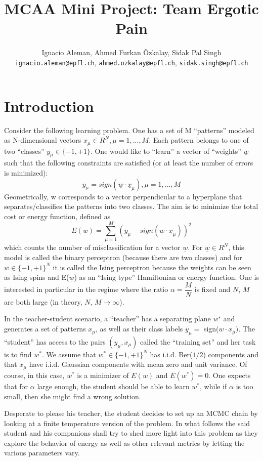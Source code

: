 \documentclass[a4paper]{article}
\title{MCAA Mini Project: Team Ergotic Pain}
\author{Ignacio Aleman, Ahmed Furkan Özkalay, Sidak Pal Singh\\\texttt{ignacio.aleman@epfl.ch}, \texttt{ahmed.ozkalay@epfl.ch}, \texttt{sidak.singh@epfl.ch}}
\begin{document}
\maketitle

\vspace*{\fill}
\section{Introduction}

Consider the following learning problem. One has a set of M “patterns” modeled as N-dimensional vectors $x_\mu \in R^{N}, \mu = 1, . . . , M$. Each pattern belongs to one of two “classes” $y_\mu \in \{−1, +1\}$. One would like to “learn” a vector of “weights” $\underline{w}$ such that the following constraints are satisfied (or at least the number of errors is minimized):
$$y_\mu = sign(\underline{w} \cdot \underline{x}_\mu), \mu = 1, . . . , M$$
Geometrically, w corresponds to a vector perpendicular to a hyperplane that separates/classifies the patterns into two classes. The aim is to minimize the total cost or energy function, defined as
$$E(w) = \sum_{\mu=1}^{M}(y_\mu − sign(\underline{w} \cdot \underline{x}_\mu))^2$$
which counts the number of misclassification for a vector $\underline{w}$.
For $\underline{w} \in R^{N}$, this model is called the binary perceptron (because there are two classes) and for $\underline{w} \in \{−1, +1\}^{N}$ it is called the Ising perceptron because the weights can be seen as Ising spins and E($\underline{w}$) as an “Ising type” Hamiltonian or energy function. One is interested in particular in the regime where the ratio $\alpha = \dfrac{M}{N}$ is fixed and $N$, $M$ are both large (in theory, $N$, $M \to\infty$).

In the teacher-student scenario, a “teacher” has a separating plane $w^{∗}$ and generates a set of patterns $x_\mu$, as well as their class labels $y_\mu =$ sign($w \cdot x_\mu)$. The “student” has access to the pairs $(y_\mu, x_\mu)$ called the “training set” and her task is to find $w^{*}$. We assume that $w^{*} \in \{-1, +1\}^{N}$ has i.i.d. Ber($1/2$) components and that $x_\mu$ have i.i.d. Gaussian components with mean zero and unit variance. Of course, in this case, $w^{*}$ is a minimizer of $E(w)$ and $E(w^{*}) = 0$. One expects that for $\alpha$ large enough, the student should be able to learn $w^{*}$, while if $\alpha$ is too small, then she might find a wrong solution.

Desperate to please his teacher, the student decides to set up an MCMC chain by looking at a finite temperature version of the problem. In what follows the said student and his companions shall try to shed more light into this problem as they explore the behavior of energy as well as other relevant metrics by letting the various parameters vary.
\end{document}
